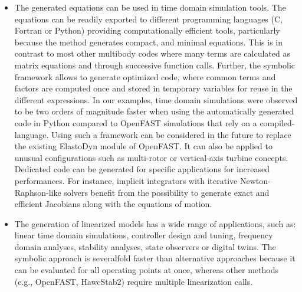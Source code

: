 \documentclass[wes, manuscript]{copernicus}
\begin{document}
\begin{itemize}
\item The generated equations can be used in time domain simulation tools.
The equations can be readily exported to different programming languages (C, Fortran or Python)  providing computationally efficient tools, particularly because the method generates compact, and minimal equations.
This is in contrast to most other multibody codes where many terms are calculated as matrix equations and through successive function calls.
Further, the symbolic framework allows to generate optimized code, where common terms and factors are computed once and stored in temporary variables for reuse in the different expressions.
%
In our examples, time domain simulations were observed to be two orders of magnitude faster when using the automatically generated code in Python compared to OpenFAST simulations that rely on a compiled-language. 
%
Using such a framework can be considered in the future to replace the existing ElastoDyn module of OpenFAST.
It can also be applied to unusual configurations such as multi-rotor or vertical-axis turbine concepts. 
%
Dedicated code can be generated for specific applications for increased performances.
For instance, implicit integrators with iterative Newton-Raphson-like solvers benefit from the possibility to generate exact and efficient Jacobians along with the equations of motion.


\item The generation of linearized models has a wide range of applications, such as: linear time domain simulations, controller design and tuning, frequency domain analyses, stability analyses, state observers or digital twins.
The symbolic approach is severalfold faster than alternative approaches because it can be evaluated for all operating points at once, whereas other methods (e.g., OpenFAST, HawcStab2) require multiple linearization calls.


\end{itemize}
\end{document}
